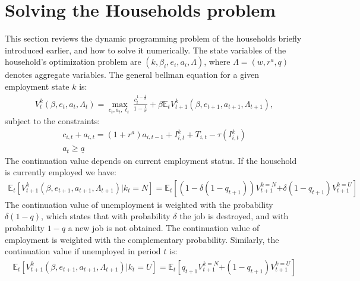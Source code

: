 





\section{Solving the Households problem} \label{sec:Sol_method}
This section reviews the dynamic programming problem of the households briefly introduced earlier, and how to solve it numerically. The state variables of the household's optimization problem are $\left(k, \beta_{i},e_{i},a_{i},\Lambda\right)$, where $\Lambda=\left(w,r^a,q\right)$ denotes aggregate variables. The general bellman equation for a given employment state $k$ is:
\begin{align*}
V_{t}^{k}\left(\beta,e_{t},a_{t},\Lambda_{t}\right)=\max_{c_{t},a_{t},\ell_{t}}\frac{c_{t}^{1-\frac{1}{\sigma}}}{1-\frac{1}{\sigma}}+\beta\mathbb{E}_{t}V_{t+1}^{k}\left(\beta,e_{t+1},a_{t+1},\Lambda_{t+1}\right),
\end{align*}
subject to the constraints:
\begin{gather*}
c_{i,t}+a_{i,t}=\left(1+r^a\right)a_{i,t-1}+I^k_{i,t}+T_{i,t}-\tau\left(I^k_{i,t}\right) \\
 a_{t}\geq\underline{a} 
\end{gather*}
The continuation value depends on current employment status. If the household is currently employed we have:
\begin{gather*}
\mathbb{E}_{t}\left[V_{t+1}^{k}\left(\beta,e_{t+1},a_{t+1},\Lambda_{t+1}\right)\left|k_{t}=N\right.\right]=\mathbb{E}_{t}\left[\left(1-\delta\left(1-q_{t+1}\right)\right)V_{t+1}^{k=N}\right.\left.+\delta\left(1-q_{t+1}\right)V_{t+1}^{k=U}\right]
\end{gather*}
The continuation value of unemployment is weighted with the probability $\delta\left(1-q\right)$, which states that with probability $\delta$ the job is destroyed, and with probability $1-q$ a new job is not obtained. The continuation value of employment is weighted with the complementary probability. Similarly, the continuation value if unemployed in period $t$ is:
\begin{gather*}
\mathbb{E}_{t}\left[V_{t+1}^{k}\left(\beta,e_{t+1},a_{t+1},\Lambda_{t+1}\right)\left|k_{t}=U\right.\right]=\mathbb{E}_{t}\left[q_{t+1}V_{t+1}^{k=N}\right.\left.+\left(1-q_{t+1}\right)V_{t+1}^{k=U}\right]
\end{gather*}


